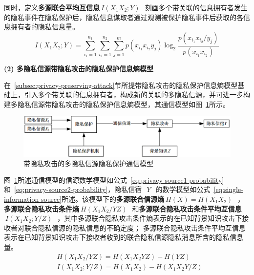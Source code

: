 同时，定义\textbf{多源联合平均互信息}$~I(X_{1}X_{2};Y)~$~刻画多个带关联的信息拥有者发生的隐私事件在隐私保护后，隐私信息谋取者通过观测被保护隐私事件后获取的各信息拥有者的隐私信息量。
\begin{equation}
I(X_{1}X_{2};Y)=\sum_{i_{1}=1}^{n_{1}}\sum_{i_{2}=1}^{n_{2}}\sum_{j=1}^{m}p(x_{i_{1}}x_{i_{2}}y_{j})\log_{2}\frac{p(x_{i_{1}}x_{i_{2}}/y_{j})}{p(x_{i_{1}}x_{i_{2}})}
\end{equation}

\textbf{(2) 多隐私信源带隐私攻击的隐私保护信息熵模型}

在~\ref{subsec:privacy-preserving-attack}节所提带隐私攻击的隐私保护信息熵模型基础上，引入多个带关联的信息拥有者，构成新的关联的多隐私信源，并可进一步构建多隐私信源带隐私攻击的隐私保护信息熵模型，其通信模型如图~\ref{fig:Communication-Model-for-Privacy-of-Multi-Source-attacks}所示。

\begin{figure}[htbp]
	\centering
	\includegraphics[width = 0.95\linewidth]{./figures/Communication-Model-for-Privacy-of-Multi-Source-attacks.png}
	\caption{带隐私攻击的多隐私信源隐私保护通信模型}
	\label{fig:Communication-Model-for-Privacy-of-Multi-Source-attacks}
\end{figure}

图~\ref{fig:Communication-Model-for-Privacy-of-Multi-Source-attacks}所述通信模型的信源数学模型如公式~\ref{eq:privacy-source1-probability}和~\ref{eq:privacy-source2-probability}，隐私信宿~$~Y~$~的数学模型如公式~\ref{eq:single-information-source}所述。该模型下的\textbf{多源联合信源熵}$~H(X)=H(X_{1}X_{2})~$~，\textbf{多源联合隐私攻击条件熵}$~H(X_{1}X_{2}/YZ)~$~和\textbf{多源联合隐私攻击条件平均互信息}$~I(X_{1}X_{2};Y/Z)~$~，其中多源联合隐私攻击条件熵表示的在已知背景知识攻击下接收者对联合隐私信源的隐私信息的不确定度； 多源联合隐私攻击条件平均互信息表示在已知背景知识攻击下接收者收到的联合隐私信源隐私消息所含的隐私信息量。
\begin{equation}
\begin{split}
&H(X_{1}X_{2}/YZ)=H(X_{1}X_{2}YZ)-H(YZ)\\
&I(X_{1}X_{2};Y/Z)=H(X_{1}X_{2})-H(X_{1}X_{2}Y/Z)
\end{split}
\end{equation}

